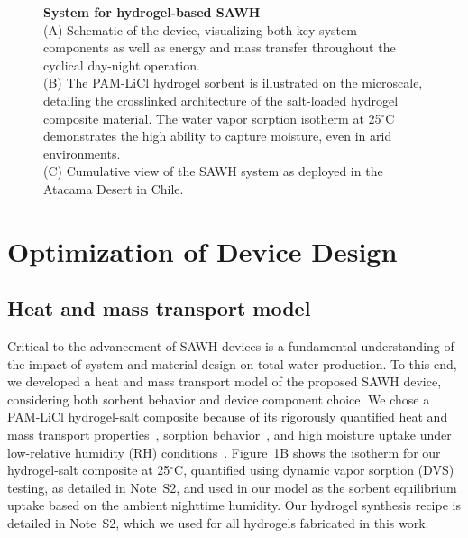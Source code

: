 \documentclass[11pt]{article}
\begin{document}
\begin{figure}[t]
\centering
{}
\caption{\textbf{System for hydrogel-based SAWH} \\
(A) Schematic of the device, visualizing both key system components as well as energy and mass transfer throughout the cyclical day-night operation. \\
(B) The PAM-LiCl hydrogel sorbent is illustrated on the microscale, detailing the crosslinked architecture of the salt-loaded hydrogel composite material. The water vapor sorption isotherm at 25$^\circ$C demonstrates the high ability to capture moisture, even in arid environments. \\
(C) Cumulative view of the SAWH system as deployed in the Atacama Desert in Chile.}
\label{fig:fig1}
\end{figure}

\section{Optimization of Device Design}

\subsection{Heat and mass transport model}

Critical to the advancement of SAWH devices is a fundamental understanding of the impact of system and material design on total water production. To this end, we developed a heat and mass transport model of the proposed SAWH device, considering both sorbent behavior and device component choice. We chose a PAM-LiCl hydrogel-salt composite because of its rigorously quantified heat and mass transport properties~\cite{diazmarin2022b}, sorption behavior~\cite{diazmarin2022c}, and high moisture uptake under low-relative humidity (RH) conditions~\cite{graeber2023}. Figure~\ref{fig:fig1}B shows the isotherm for our hydrogel-salt composite at 25$^\circ$C, quantified using dynamic vapor sorption (DVS) testing, as detailed in Note~S2, and used in our model as the sorbent equilibrium uptake based on the ambient nighttime humidity. Our hydrogel synthesis recipe is detailed in Note~S2, which we used for all hydrogels fabricated in this work.
\end{document}
